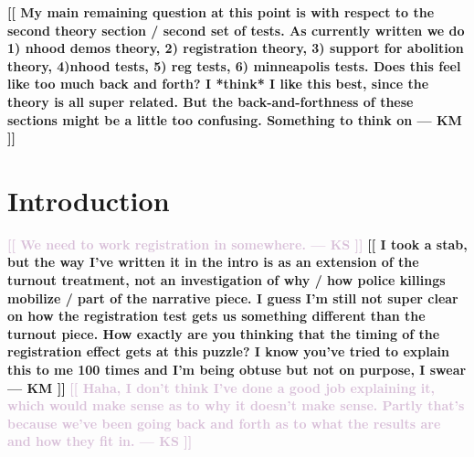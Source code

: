 \documentclass[12pt]{article}
\newcommand{\kscomment}[1]{\textbf{\textcolor{Thistle}{[[ #1 --- KS ]]}}}
\newcommand{\kmcomment}[1]{\textbf{\textcolor{JungleGreen}{[[ #1 --- KM ]]}}}
\begin{document}
\kmcomment{My main remaining question at this point is with respect to the second theory section / second set of tests. As currently written we do 1) nhood demos theory, 2) registration theory, 3) support for abolition theory, 4)nhood tests, 5) reg tests, 6) minneapolis tests. Does this feel like too much back and forth? I *think* I like this best, since the theory is all super related. But the back-and-forthness of these sections might be a little too confusing. Something to think on}

\section*{Introduction} %


\kscomment{We need to work registration in somewhere.}
\kmcomment{I took a stab, but the way I've written it in the intro is as an extension of the turnout treatment, not an investigation of why / how police killings mobilize / part of the narrative piece. I guess I'm still not super clear on how the registration test gets us something different than the turnout piece. How exactly are you thinking that the timing of the registration effect gets at this puzzle? I know you've tried to explain this to me 100 times and I'm being obtuse but not on purpose, I swear} \kscomment{Haha, I don't think I've done a good job explaining it, which would make sense as to why it doesn't make sense. Partly that's because we've been going back and forth as to what the results are and how they fit in. }
\end{document}

